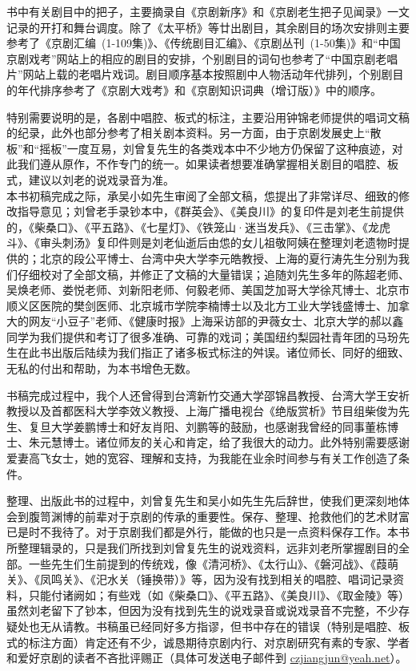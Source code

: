 {书中有关剧目中的把子，主要摘录自《京剧新序》和《京剧老生把子见闻录》一文记录的开打和舞台调度。\textrm{除了《太平桥》等廿出剧目，其余剧目的场次安排则主要参考了《京剧汇编~(1-109集)》、《传统剧目汇编》、《京剧丛刊~(1-50集)》和``中国京剧戏考''网站上的相应的剧目的安排，个别剧目的词句也参考了``中国京剧老唱片''网站上载的老唱片戏词。剧目顺序基本按照剧中人物活动年代排列，个别剧目的年代排序参考了《京剧大戏考》}和《京剧知识词典（增订版）》\textrm{中的顺序。}

特别需要说明的是，各剧中唱腔、板式的标注，主要沿用钟锦老师提供的唱词文稿的纪录，此外也部分参考了相关剧本资料。另一方面，由于京剧发展史上``散板''和``摇板''一度互易，刘曾复先生的各类戏本中不少地方仍保留了这种痕迹，对此我们遵从原作，不作专门的统一。如果读者想要准确掌握相关剧目的唱腔、板式，建议以刘老的说戏录音为准。\\


本书初稿完成之际，承吴小如先生审阅了全部文稿，怹提出了非常详尽、细致的修改指导意见；刘曾老手录钞本中，《群英会》、《美良川》的复印件是刘老生前提供的，\textrm{《柴桑口》、《平五路》、《七星灯》、《铁笼山·迷当发兵》、《三击掌》、《龙虎斗》、《审头刺汤》}复印件则是刘老仙逝后由怹的女儿\textrm{祖敬阿姨在整理刘老遗物时提供的；北京的}段公平博士、\textrm{台湾中央大学}李元皓教授、上海的夏行涛先生分别为我们仔细校对了全部文稿，并修正了文稿的大量错误；\textrm{追随刘先生多年的}陈超老师、吴焕老师、娄悦老师、刘新阳老师、\textrm{何毅老师、美国芝加哥大学徐芃博士、北京市顺义区医院的樊剑医师、北京城市学院李楠博士以及北方工业大学钱盛博士、加拿大的网友``小豆子''老师、《健康时报》上海采访部的尹薇女士、北京大学的郝以鑫同学为我们提供和考订了很多准确、可靠的戏词；美国纽约梨园社青年团的马玢先生在此书出版后陆续为我们指正了诸多板式标注的舛误。诸位师长、同好的细致、无私的付出和帮助，为本书增色无数。}

\textrm{书稿完成过程中，我个人还曾得到台湾新竹交通大学邵锦昌教授、台湾大学王安祈教授以及首都医科大学李效义教授、上海广播电视台《绝版赏析》节目组柴俊为先生、复旦大学姜鹏博士和好友肖阳、刘鹏等的鼓励，也感谢我曾经的同事董栋博士、朱元慧博士。诸位师友的关心和肯定，给了我很大的动力。此外特别需要感谢爱妻高飞女士，她的宽容、理解和支持，为我能在业余时间参与有关工作创造了条件。}

\textrm{整理、出版此书的过程中，刘曾复先生和吴小如先生先后辞世，使我们更深刻地体会到腹笥渊博的前辈对于京剧的传承的重要性。保存、整理、抢救他们的艺术财富已是时不我待了。对于京剧我们都是外行，能做的也只是一点资料保存工作。本书所整理辑录的，只是我们所找到刘曾复先生的说戏资料，远非刘老所掌握剧目的全部。一些先生们生前提到的传统戏，像《清河桥》、《太行山》、《磐河战》、《葭萌关》、《凤鸣关》、《汜水关（锤换带）》等，因为没有找到相关的唱腔、唱词记录资料，只能付诸阙如；有些戏（如《柴桑口》、《平五路》、《美良川》、《取金陵》等）虽然刘老留下了钞本，但因为没有找到先生的说戏录音或说戏录音不完整，不少存疑处也无从请教。书稿虽已经同好多方指谬，但}书中存在的错误（特别是唱腔、板式的标注方面）肯定还有不少，诚恳期待京剧内行、对京剧研究有素的专家、学者和爱好京剧的读者不吝批评赐正（具体可发送电子邮件到
\href{mailto:czjiangjun@yeah.net}{{czjiangjun@yeah.net}}）。\\


}
